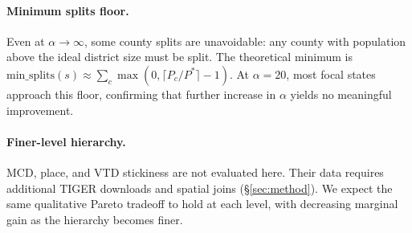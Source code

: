 \paragraph{Minimum splits floor.}
Even at $\alpha \to \infty$, some county splits are unavoidable: any county with
population above the ideal district size must be split.
The theoretical minimum is $\text{min\_splits}(s) \approx \sum_c \max(0, \lceil P_c / P^* \rceil - 1)$.
At $\alpha = 20$, most focal states approach this floor, confirming that further
increase in $\alpha$ yields no meaningful improvement.

\paragraph{Finer-level hierarchy.}
MCD, place, and VTD stickiness are not evaluated here.
Their data requires additional TIGER downloads and spatial joins (§\ref{sec:method}).
We expect the same qualitative Pareto tradeoff to hold at each level, with
decreasing marginal gain as the hierarchy becomes finer.

